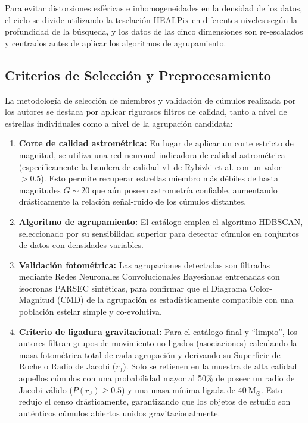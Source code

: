         Para evitar distorsiones esféricas e inhomogeneidades en la densidad de 
        los datos, el cielo se divide utilizando la teselación HEALPix en 
        diferentes niveles según la profundidad de la búsqueda, y los datos de 
        las cinco dimensiones son re-escalados y centrados antes de aplicar los 
        algoritmos de agrupamiento.

    \subsection{Criterios de Selección y Preprocesamiento}
        La metodología de selección de miembros y validación de cúmulos 
        realizada por los autores se destaca por aplicar rigurosos filtros de 
        calidad, tanto a nivel de estrellas individuales como a nivel de la 
        agrupación candidata:

        \begin{enumerate}
            \item \textbf{Corte de calidad astrométrica:} En lugar de aplicar un 
            corte estricto de magnitud, se utiliza una red neuronal indicadora 
            de calidad astrométrica (específicamente la bandera de calidad v1 de 
            Rybizki et al. con un valor $> 0.5$). Esto permite recuperar 
            estrellas miembro más débiles de hasta magnitudes $G \sim 20$ que 
            aún poseen astrometría confiable, aumentando drásticamente la 
            relación señal-ruido de los cúmulos distantes.

            \item \textbf{Algoritmo de agrupamiento:} El catálogo emplea el 
            algoritmo HDBSCAN, seleccionado por su sensibilidad superior para 
            detectar cúmulos en conjuntos de datos con densidades variables.

            \item \textbf{Validación fotométrica:} Las agrupaciones detectadas 
            son filtradas mediante Redes Neuronales Convolucionales Bayesianas 
            entrenadas con isocronas PARSEC sintéticas, para confirmar que el 
            Diagrama Color-Magnitud (CMD) de la agrupación es estadísticamente 
            compatible con una población estelar simple y co-evolutiva.

            \item \textbf{Criterio de ligadura gravitacional:} Para el catálogo 
            final y ``limpio'', los autores filtran grupos de movimiento no 
            ligados (asociaciones) calculando la masa fotométrica total de cada 
            agrupación y derivando su Superficie de Roche o Radio de Jacobi 
            ($r_\text{J}$). Solo se retienen en la muestra de alta calidad 
            aquellos cúmulos con una probabilidad mayor al 50\% de poseer un 
            radio de Jacobi válido ($P(r_\text{J}) \ge 0.5$) y una masa mínima 
            ligada de $40\ \text{M}_\odot$. Esto redujo el censo drásticamente, 
            garantizando que los objetos de estudio son auténticos cúmulos 
            abiertos unidos gravitacionalmente.
        \end{enumerate}

